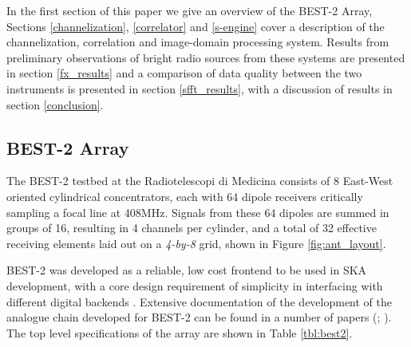 \documentclass[useAMS,macros,usenatbib,onecolumn]{mn2e}
\begin{document}
In the first section of this paper we give an overview of the BEST-2 Array, Sections \ref{channelization}, \ref{correlator} and \ref{s-engine} cover a description of the channelization, correlation and image-domain processing system.
Results from preliminary observations of bright radio sources from these systems are presented in section \ref{fx_results} and a comparison of data quality between the two instruments is presented in section \ref{sfft_results}, with a discussion of results in section \ref{conclusion}.

\subsection{BEST-2 Array}
\label{best-2 array}

The BEST-2 testbed at the Radiotelescopi di Medicina consists of 8 East-West oriented cylindrical concentrators, each with 64 dipole receivers critically sampling a focal line at 408MHz.
Signals from these 64 dipoles are summed in groups of 16, resulting in 4 channels per cylinder, and a total of 32 effective receiving elements laid out on a \emph{4-by-8} grid, shown in Figure \ref{fig:ant_layout}.

BEST-2 was developed as a reliable, low cost frontend to be used in SKA development, with a core design requirement of simplicity in interfacing with different digital backends \citep{best2}.
Extensive documentation of the development of the analogue chain developed for BEST-2 can be found in a number of papers (\cite{best2-lna}; \cite{best2-rec}). The top level specifications of the array are shown in Table \ref{tbl:best2}.

\end{document}
